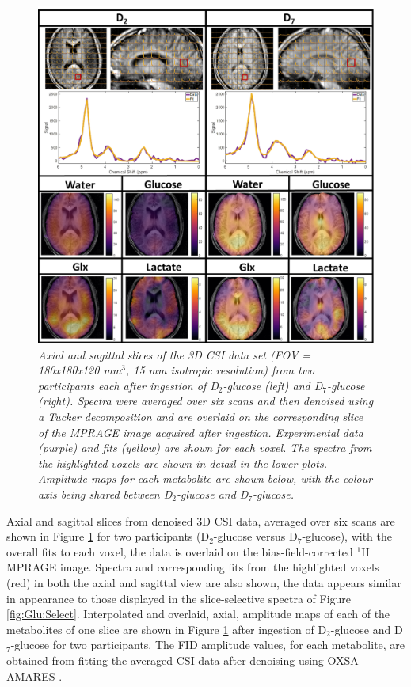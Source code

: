 \documentclass[class=article, crop=false]{standalone}
\begin{document}
\begin{figure}
    \centering
    \includegraphics[width = 1\textwidth]{Figures/Glucose/CSI.png}
    \caption{\textit{Axial and sagittal slices of the 3D CSI data set (FOV = 180x180x120 mm$^3$, 15 mm isotropic resolution) from two participants each after ingestion of D$_2$-glucose (left) and D$_7$-glucose (right). Spectra were averaged over six scans and then denoised using a Tucker decomposition and are overlaid on the corresponding slice of the MPRAGE image acquired after ingestion. Experimental data (purple) and fits (yellow) are shown for each voxel. The spectra from the highlighted voxels are shown in detail in the lower plots. Amplitude maps for each metabolite are shown below, with the colour axis being shared between D$_2$-glucose and D$_7$-glucose.}}
    \label{fig:Glu:CSI}
\end{figure}

Axial and sagittal slices from denoised 3D CSI data, averaged over six scans are shown in Figure \ref{fig:Glu:CSI} for two participants (D$_2$-glucose versus D$_7$-glucose), with the overall fits to each voxel, the data is overlaid on the bias-field-corrected $^1$H MPRAGE image. Spectra and corresponding fits from the highlighted voxels (red) in both the axial and sagittal view are also shown, the data appears similar in appearance to those displayed in the slice-selective spectra of Figure \ref{fig:Glu:Select}. Interpolated and overlaid, axial, amplitude maps of each of the metabolites of one slice are shown in Figure \ref{fig:Glu:CSI} after ingestion of D$_2$-glucose and D$_7$-glucose for two participants. The FID amplitude values, for each metabolite, are obtained from fitting the averaged CSI data after denoising using OXSA-AMARES \cite{Vanhamme1997ImprovedKnowledge, Purvis2017OXSA:MATLAB}.
\end{document}
